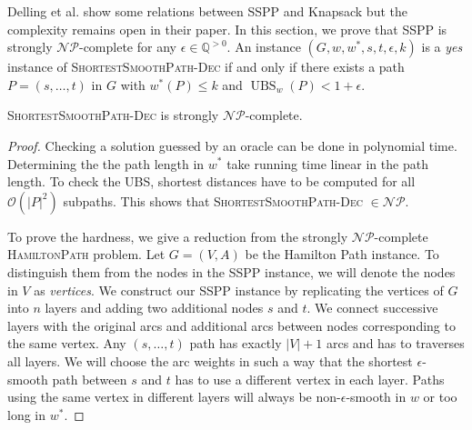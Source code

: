 \documentclass[a4paper,UKenglish,cleveref, autoref, thm-restate]{lipics-v2021}
\newcommand*{\ubs}{\operatorname{UBS}}
\begin{document}
Delling et al. show some relations between SSPP and Knapsack but the complexity remains open in their paper.
In this section, we prove that SSPP is strongly $\mathcal{NP}$-complete for any $\epsilon \in \mathbb{Q}^{>0}$.
An instance $(G, w, w^*, s, t, \epsilon, k)$ is a \emph{yes} instance of \textsc{ShortestSmoothPath-Dec} if and only if there exists a path $P = (s,\dots, t)$ in $G$ with $w^*(P) \leq k$ and $\ubs_w(P) < 1 + \epsilon$.

\begin{theorem}
\textsc{ShortestSmoothPath-Dec} is strongly $\mathcal{NP}$-complete.
\end{theorem}

\begin{proof}
Checking a solution guessed by an oracle can be done in polynomial time.
Determining the the path length in $w^*$ take running time linear in the path length.
To check the UBS, shortest distances have to be computed for all $\mathcal{O}(|P|^2)$ subpaths.
This shows that \textsc{ShortestSmoothPath-Dec} $\in \mathcal{NP}$.

To prove the hardness, we give a reduction from the strongly $\mathcal{NP}$-complete \textsc{HamiltonPath} problem.
Let $G=(V,A)$ be the Hamilton Path instance.
To distinguish them from the nodes in the SSPP instance, we will denote the nodes in $V$ as \emph{vertices}.
We construct our SSPP instance by replicating the vertices of $G$ into $n$ layers and adding two additional nodes $s$ and $t$.
We connect successive layers with the original arcs and additional arcs between nodes corresponding to the same vertex.
Any $(s,\dots,t)$ path has exactly $|V|+1$ arcs and has to traverses all layers.
We will choose the arc weights in such a way that the shortest $\epsilon$-smooth path between $s$ and $t$ has to use a different vertex in each layer.
Paths using the same vertex in different layers will always be non-$\epsilon$-smooth in $w$ or too long in $w^*$.


\end{proof}
\end{document}

